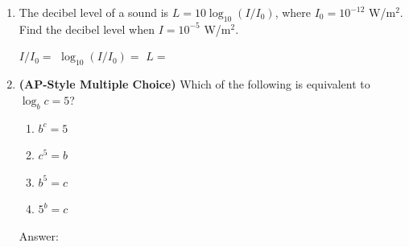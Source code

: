 \documentclass[10pt]{article}
\begin{document}
\begin{enumerate}[itemsep=14pt]
      \vspace{0.04in}
      (a) $\log_2 11$: between \blank{1cm} and \blank{1cm}
            \hspace{0.5em} because $2^{\blank{1cm}} < 11 < 2^{\blank{1cm}}$

      \vspace{0.06in}
      (b) $\log_3 50$: between \blank{1cm} and \blank{1cm}
            \hspace{0.5em} because $3^{\blank{1cm}} < 50 < 3^{\blank{1cm}}$

      \vspace{0.06in}
      (c) $\log_{10} 500$: between \blank{1cm} and \blank{1cm}
            \hspace{0.5em} because $10^{\blank{1cm}} < 500 < 10^{\blank{1cm}}$

\item The decibel level of a sound is $L = 10\log_{10}(I / I_0)$, where $I_0 = 10^{-12}$ W/m$^2$.
      Find the decibel level when $I = 10^{-5}$ W/m$^2$.

      \vspace{0.06in}
      $I / I_0 = $ \blank{3cm} \qquad $\log_{10}(I / I_0) = $ \blank{3cm} \qquad $L = $ \blank{3cm}

\item \textbf{(AP-Style Multiple Choice)} Which of the following is equivalent to $\log_b c = 5$?

      \medskip
      \begin{enumerate}[label=(\Alph*), itemsep=4pt]
        \item $b^c = 5$
        \item $c^5 = b$
        \item $b^5 = c$
        \item $5^b = c$
      \end{enumerate}

      \vspace{0.04in}
      Answer: \blank{1.5cm}

\end{enumerate}
\end{document}
